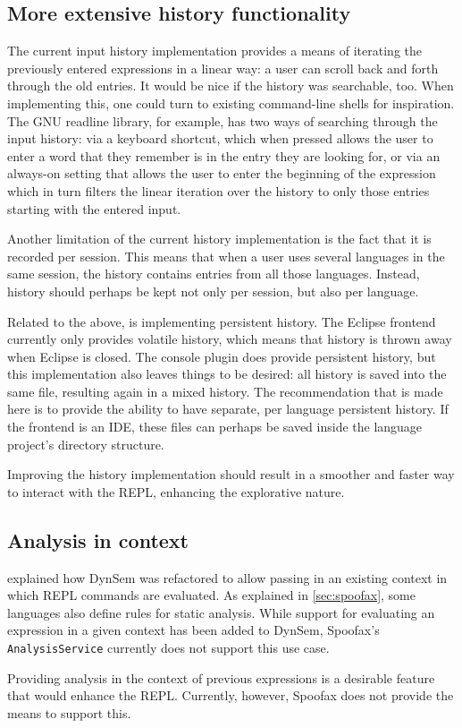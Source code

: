 \subsection{More extensive history functionality}

The current input history implementation provides a means of iterating the
previously entered expressions in a linear way: a user can scroll back and forth
through the old entries. It would be nice if the history was searchable, too.
When implementing this, one could turn to existing command-line shells for
inspiration. The GNU readline library, for example, has two ways of searching
through the input history: via a keyboard shortcut, which when pressed allows
the user to enter a word that they remember is in the entry they are looking
for, or via an always-on setting that allows the user to enter the beginning of
the expression which in turn filters the linear iteration over the
history to only those entries starting with the entered input.

Another limitation of the current history implementation is the fact that it is
recorded per session. This means that when a user uses several languages in the
same session, the history contains entries from all those languages. Instead,
history should perhaps be kept not only per session, but also per language.

Related to the above, is implementing persistent history. The Eclipse frontend
currently only provides volatile history, which means that history is thrown
away when Eclipse is closed. The console plugin does provide persistent history,
but this implementation also leaves things to be desired: all history is saved
into the same file, resulting again in a mixed history. The recommendation that
is made here is to provide the ability to have separate, per language
persistent history. If the frontend is an IDE, these files can perhaps be saved
inside the language project's directory structure.

Improving the history implementation should result in a smoother and
faster way to interact with the REPL, enhancing the explorative nature.

\subsection{Analysis in context}

 explained how DynSem was refactored to allow passing
in an existing context in which REPL commands are evaluated. As explained
in \cref{sec:spoofax}, some languages also define rules for static analysis.
While support for evaluating an expression in a given context has been added to
DynSem, Spoofax's \texttt{AnalysisService} currently does not support this
use case.

Providing analysis in the context of previous expressions is a desirable
feature that would enhance the REPL. Currently, however,
Spoofax does not provide the means to support this.


